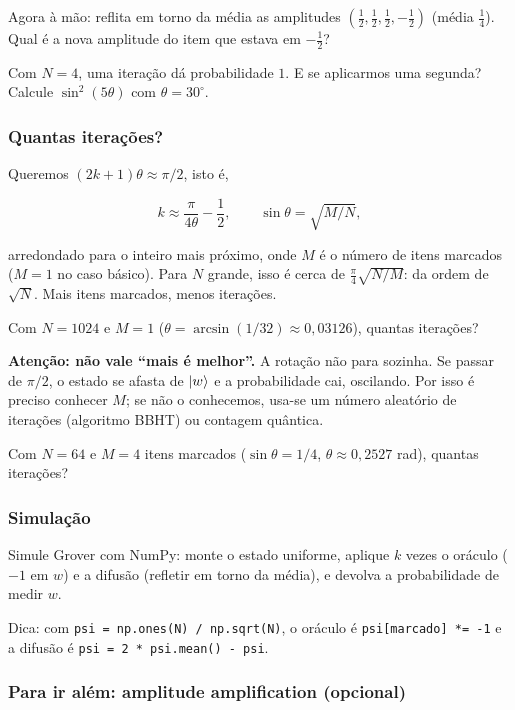 Agora à mão: reflita em torno da média as amplitudes \((\tfrac12,\tfrac12,\tfrac12,-\tfrac12)\) (média \(\tfrac14\)). Qual é a nova amplitude do item que estava em \(-\tfrac12\)?

Com \(N=4\), uma iteração dá probabilidade \(1\). E se aplicarmos uma segunda? Calcule \(\sin^2(5\theta)\) com \(\theta=30^\circ\).

\subsubsection{Quantas iterações?}\label{quantas-iterauxe7uxf5es}

Queremos \((2k+1)\theta\approx\pi/2\), isto é,

\[
k\approx\frac{\pi}{4\theta}-\frac12,\qquad \sin\theta=\sqrt{M/N},
\]

arredondado para o inteiro mais próximo, onde \(M\) é o número de itens marcados (\(M=1\) no caso básico). Para \(N\) grande, isso é cerca de \(\tfrac\pi4\sqrt{N/M}\): da ordem de \(\sqrt N\). Mais itens marcados, menos iterações.

Com \(N=1024\) e \(M=1\) (\(\theta=\arcsin(1/32)\approx0{,}03126\)), quantas iterações?

\textbf{Atenção: não vale ``mais é melhor''.} A rotação não para sozinha. Se passar de \(\pi/2\), o estado se afasta de \(\left|{w}\right>\) e a probabilidade cai, oscilando. Por isso é preciso conhecer \(M\); se não o conhecemos, usa-se um número aleatório de iterações (algoritmo BBHT) ou contagem quântica.

Com \(N=64\) e \(M=4\) itens marcados (\(\sin\theta=1/4\), \(\theta\approx0{,}2527\) rad), quantas iterações?

\subsubsection{Simulação}\label{simulauxe7uxe3o}

Simule Grover com NumPy: monte o estado uniforme, aplique \(k\) vezes o oráculo (\(-1\) em \(w\)) e a difusão (refletir em torno da média), e devolva a probabilidade de medir \(w\).

Dica: com \texttt{psi\ =\ np.ones(N)\ /\ np.sqrt(N)}, o oráculo é \texttt{psi{[}marcado{]}\ *=\ -1} e a difusão é \texttt{psi\ =\ 2\ *\ psi.mean()\ -\ psi}.

\subsubsection{Para ir além: amplitude amplification (opcional)}\label{para-ir-aluxe9m-amplitude-amplification-opcional}

